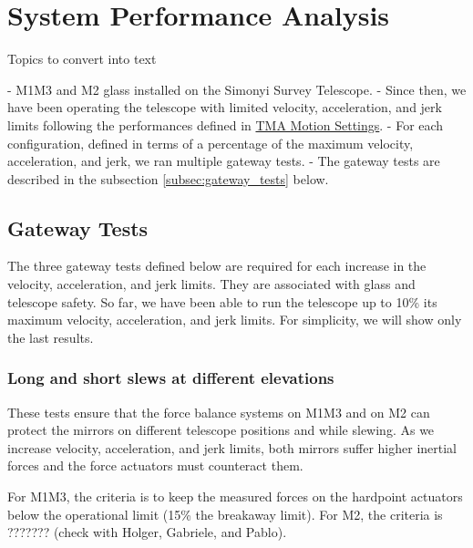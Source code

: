 \section{System Performance Analysis}
\label{sec:system_performance_analysis}

\newcommand{\TMAMotionSettings}{\href{https://rubinobs.atlassian.net/wiki/spaces/LSSTCOM/pages/53741249/TMA+Motion+Settings}{TMA Motion Settings}}

Topics to convert into text

\begin{itemize}
    - M1M3 and M2 glass installed on the Simonyi Survey Telescope.
    - Since then, we have been operating the telescope with limited velocity,
    acceleration, and jerk limits following the performances defined in \TMAMotionSettings.
    - For each configuration, defined in terms of a percentage of the maximum
    velocity, acceleration, and jerk, we ran multiple gateway tests.
    - The gateway tests are described in the subsection \ref{subsec:gateway_tests} below.
\end{itemize}

\subsection{Gateway Tests}

The three gateway tests defined below are required for each increase in the
velocity, acceleration, and jerk limits. They are associated with glass and
telescope safety. So far, we have been able to run the telescope up to 10\%
its maximum velocity, acceleration, and jerk limits. For simplicity, we will
show only the last results.


\subsubsection{Long and short slews at different elevations}
\label{subsubsec:long_and_short_slews}

These tests ensure that the force balance systems on M1M3 and on M2 can protect
the mirrors on different telescope positions and while slewing. As we increase
velocity, acceleration, and jerk limits, both mirrors suffer higher inertial
forces and the force actuators must counteract them.

For M1M3, the criteria is to keep the measured forces on the hardpoint actuators
below the operational limit (15\% the breakaway limit). For M2, the criteria is
??????? (check with Holger, Gabriele, and Pablo). %

